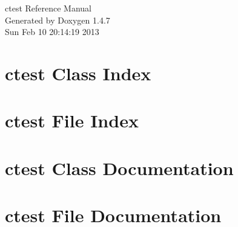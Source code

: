 \documentclass[a4paper]{book}
\begin{document}
\begin{titlepage}
\vspace*{7cm}
\begin{center}
{\Large ctest Reference Manual}\\
\vspace*{1cm}
{\large Generated by Doxygen 1.4.7}\\
\vspace*{0.5cm}
{\small Sun Feb 10 20:14:19 2013}\\
\end{center}
\end{titlepage}
\clearemptydoublepage
{}
\tableofcontents
\clearemptydoublepage
{}
\chapter{ctest Class Index}

\chapter{ctest File Index}

\chapter{ctest Class Documentation}

\chapter{ctest File Documentation}







\printindex
\end{document}
